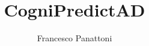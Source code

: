 \documentclass[11pt]{article}
\author{Francesco Panattoni}
\title{CogniPredictAD}
\begin{document}
	

	\tableofcontents
	\newpage
	
	\begin{multicols}{2}
		
		
		
		
		
		
		
		
		
	\end{multicols}	
\end{document}
